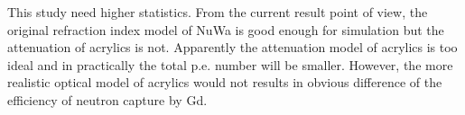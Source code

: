 

This study need higher statistics. From the current result point of view,
the original refraction index model of NuWa is good enough for simulation but the attenuation of acrylics is not.
Apparently the attenuation model of acrylics is too ideal and in practically the total p.e. number will be smaller.
However, the more realistic optical model of acrylics would not results in obvious difference of the efficiency of neutron capture by Gd.


